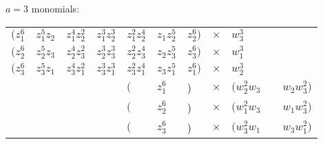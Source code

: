 \documentclass{article}
\begin{document}
	$a = 3$ monomials:

	\begin{table}[]
		\begin{tabular}{llllllll}
		$\bigg(z_{1}^{6}$ & $z_{1}^{5}z_{2}$ & $z_{1}^{4}z_{2}^{2}$ & $z_{1}^{3}z_{2}^{3}$ & $z_{1}^{2}z_{2}^{4}$ & $z_{1}z_{2}^{5}$ & $z_{2}^{6} \bigg)$ & $\times \quad w_{3}^{3}$ \\
		$\bigg(z_{2}^{6}$ & $z_{2}^{5}z_{3}$ & $z_{2}^{4}z_{3}^{2}$ & $z_{2}^{3}z_{3}^{3}$ & $z_{2}^{2}z_{3}^{4}$ & $z_{2}z_{3}^{5}$ & $z_{3}^{6} \bigg)$ & $\times \quad w_{1}^{3}$ \\
		$\bigg(z_{3}^{6}$ & $z_{3}^{5}z_{1}$ & $z_{3}^{4}z_{1}^{2}$ & $z_{3}^{3}z_{1}^{3}$ & $z_{3}^{2}z_{1}^{4}$ & $z_{3}z_{1}^{5}$ & $z_{1}^{6} \bigg)$ & $\times \quad w_{2}^{3}$ \\
		& & & & $\big($ & $z_{1}^{6}$ & \big)& $\times \quad \big( w_{2}^{2}w_{3} \qquad w_{2}w_{3}^{2} \big)$ \\
		& & & &  $\big($ & $z_{2}^{6}$ & \big)& $\times \quad \big( w_{1}^{2}w_{3} \qquad w_{1}w_{3}^{2} \big)$ \\
		& & & & $\big($ & $z_{3}^{6}$ & \big)& $\times \quad \big( w_{3}^{2}w_{1} \qquad w_{3}w_{1}^{2} \big)$ \\           
		\end{tabular}
	\end{table}

	
		
	
	
	
	

	
	
	
	
	
	
	
	
	
	  
	
	
\end{document}
